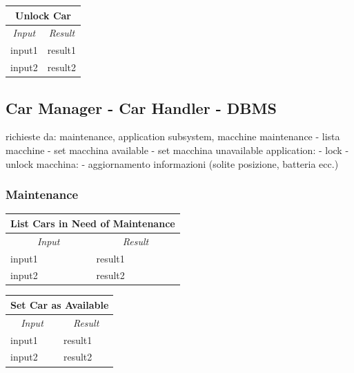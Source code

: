\documentclass[english]{article}
\begin{document}
\begin{center}
	\begin{tabular}{ | m{6cm} | m{6cm} | }
		\hline 
		\multicolumn{2}{|c|}{\textbf{Unlock Car}} \\
		\hline
		\multicolumn{1}{|c|}{\textit{Input}} & \multicolumn{1}{c|}{\textit{Result}} \\
		\hline
		input1 & result1 \\
		\hline
		input2 & result2 \\
		\hline
	\end{tabular}
\end{center}

\subsection{Car Manager - Car Handler - DBMS}
richieste da: maintenance, application subsystem, macchine
maintenance
- lista macchine
- set macchina available
- set macchina unavailable
application:
- lock 
- unlock
macchina:
- aggiornamento informazioni (solite posizione, batteria ecc.)

\subsubsection{Maintenance}
\begin{center}
	\begin{tabular}{ | m{6cm} | m{6cm} | }
		\hline 
		\multicolumn{2}{|c|}{\textbf{List Cars in Need of Maintenance}} \\
		\hline
		\multicolumn{1}{|c|}{\textit{Input}} & \multicolumn{1}{c|}{\textit{Result}} \\
		\hline
		input1 & result1 \\
		\hline
		input2 & result2 \\
		\hline
	\end{tabular}
\end{center}

\begin{center}
	\begin{tabular}{ | m{6cm} | m{6cm} | }
		\hline 
		\multicolumn{2}{|c|}{\textbf{Set Car as Available}} \\
		\hline
		\multicolumn{1}{|c|}{\textit{Input}} & \multicolumn{1}{c|}{\textit{Result}} \\
		\hline
		input1 & result1 \\
		\hline
		input2 & result2 \\
		\hline
	\end{tabular}
\end{center}
\end{document}
